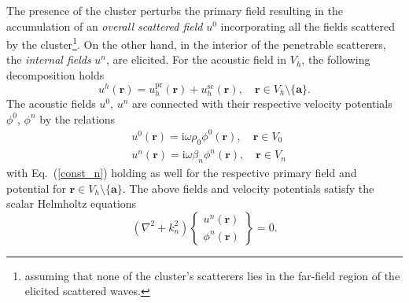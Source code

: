\documentclass{article}
\begin{document}
The presence of the cluster perturbs the primary field resulting in the accumulation of an \emph{overall scattered field} $u^{\mathrm{0}}$ incorporating all the fields scattered by the cluster\footnote{assuming that none of the cluster's scatterers lies in the far-field region of the elicited scattered waves.}. On the other hand, in the interior of the penetrable scatterers, the \emph{internal fields} $u^n$, are elicited. For the acoustic field in $V_{h}$, the following decomposition holds
%
\begin{equation}\label{eq:ps_decomp}
    u^h(\mathbf{r})=u_h^{\mathrm{pr}}(\mathbf{r})+u_h^{\mathrm{sc}}(\mathbf{r}), \quad \mathbf{r}\in V_{h}\setminus\{\mathbf{a}\}.
\end{equation}
%
The acoustic fields $u^0$, $u^n$ are connected with their respective velocity potentials  $\phi^0$, $\phi^n$ by the relations 
%
\begin{align}\label{const_0}
    &u^0(\mathbf{r})=\mathrm{i}\omega\rho_0\phi^0(\mathbf{r}), \quad \mathbf{r}\in V_0\\
    \label{const_n}&u^n(\mathbf{r})=\mathrm{i}\omega\beta_n\phi^n(\mathbf{r}), \quad \mathbf{r}\in V_n
\end{align}
%
with Eq.~(\ref{const_n}) holding as well for the respective primary field and potential for $\mathbf{r}\in V_h\setminus\{\mathbf{a}\}$. 
The above fields and velocity potentials satisfy the scalar Helmholtz equations
%
\begin{equation}\label{Helmholtz}
    (\nabla^2+k_n^2)\begin{Bmatrix}u^n(\mathbf{r})\\\phi^n(\mathbf{r})\end{Bmatrix}=0.
\end{equation}
%
\end{document}
